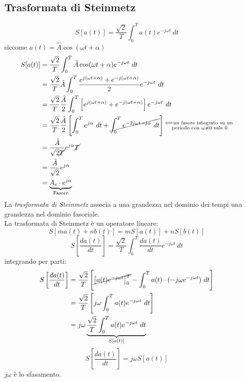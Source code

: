 \documentclass{article}
\begin{document}
\subsection{Trasformata di Steinmetz}
\[
    S[a(t)] = \frac{\sqrt{2}}{T} \int_0^T a(t) e^{-j \omega t} \ dt
\]
siccome $a(t) = \hat A \cos(\omega t + \alpha)$
\begin{align*}
    S[a(t)] &= \frac{\sqrt{2}}{T} \int_0^T \hat A \cos(\omega t + \alpha)e^{-j \omega t} \ dt\\
    &= \frac{\sqrt{2}}{T} \hat A \int_0^T \frac{e^{j(\omega t + \alpha)}+e^{-j(\omega t + \alpha)}}{2} e^{-j \omega t} \ dt\\
    &=\frac{\sqrt{2}}{T} \frac{\hat A}{2} \int_0^T \left[e^{j(\omega t + \alpha)}+e^{-j(\omega t + \alpha)}\right]e^{-j \omega t} \ dt\\
    &=\frac{\sqrt{2}}{T} \frac{\hat A}{2} \left[ \int_0^T e^{j \alpha} \ dt + \cancel{\int_0^T e^{-2j \omega t - j \alpha} \ dt} \right] \substack{\Longleftarrow \text{un fasore integrato su un} \\ \text{ periodo con } \omega \neq 0 \text{ vale 0}}\\
    &=\frac{\hat A}{\sqrt{2}\cancel{T}} e^{j \alpha} \cancel{T}\\
    &= \frac{\hat A}{\sqrt{2}}e^{j \alpha}\\
    &=\underbrace{A_e \cdot e^{j \alpha}}_{\text{Fasore}}
\end{align*}
La \textit{trasformata di Steinmetz} associa a una grandezza nel dominio dei tempi una grandezza nel dominio fasoriale.
\vspace*{0.2cm}\\
La trasformata di Steinmetz è un operatore lineare:
\[
    S [m a(t) + n b(t) ] = m S[a(t)]+nS[b(t)]
\]
\[
    S\left[\frac{da(t)}{dt}\right] = \frac{\sqrt{2}}{T} \int_0^T \frac{da(t)}{dt}e^{-j \omega t} \ dt
\]
integrando per parti:
\begin{align*}
    S\left[\frac{da(t)}{dt}\right] &= \frac{\sqrt{2}}{T} \left[\cancel{\left[a(t)e^{-j \omega t}\right]^T_0}- \int_0^T a(t) \cdot (-j \omega e^{-j \omega t}) \ dt\right] \\
    &=\frac{\sqrt{2}}{T} \left[j \omega \int_0^T  a(t)e^{-j \omega t} \ dt\right] \\
    &= j\omega \underbrace{\frac{\sqrt{2}}{T} \int_0^T a(t) e^{-j \omega t} \ dt}_{S[a(t)]}\\
\end{align*}
\[
    S\left[\frac{da(t)}{dt}\right] = j \omega S[a(t)]
\]
$j \omega$ è lo sfasamento.
\end{document}
